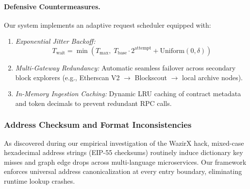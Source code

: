 \paragraph{Defensive Countermeasures.} Our system implements an adaptive request scheduler equipped with:
\begin{enumerate}
    \item \emph{Exponential Jitter Backoff:}
    \begin{equation}
        T_{\text{wait}} = \min\left(T_{\max}, \; T_{\text{base}} \cdot 2^{\text{attempt}} + \text{Uniform}(0, \delta) \right)
    \end{equation}
    \item \emph{Multi-Gateway Redundancy:} Automatic seamless failover across secondary block explorers (e.g., Etherscan V2 $\to$ Blockscout $\to$ local archive nodes).
    \item \emph{In-Memory Ingestion Caching:} Dynamic LRU caching of contract metadata and token decimals to prevent redundant RPC calls.
\end{enumerate}

\subsubsection{Address Checksum and Format Inconsistencies}
As discovered during our empirical investigation of the WazirX hack, mixed-case hexadecimal address strings (EIP-55 checksums) routinely induce dictionary key misses and graph edge drops across multi-language microservices. Our framework enforces universal address canonicalization at every entry boundary, eliminating runtime lookup crashes.
